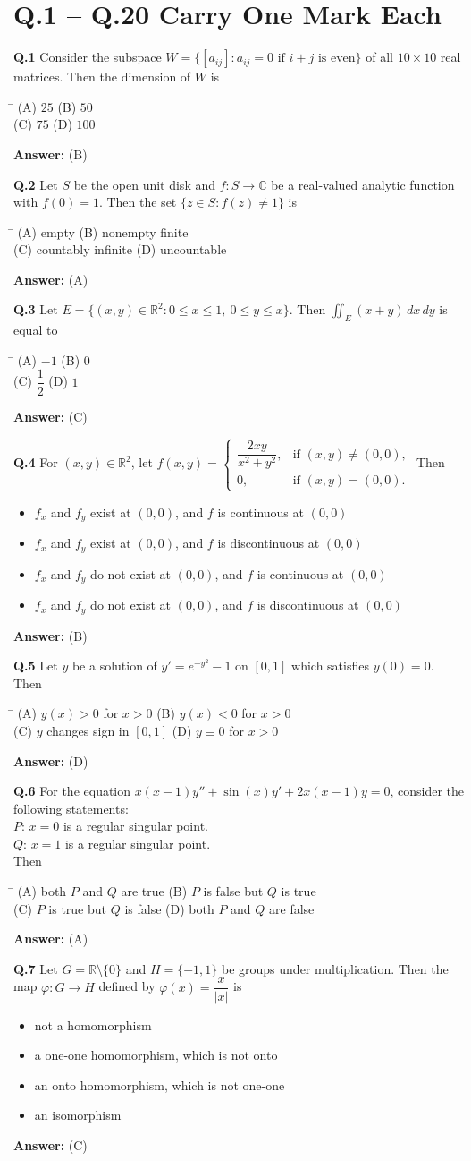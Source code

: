 \documentclass[11pt,a4paper]{article}
\newcommand{\optsfourA}[4]{%
  \begin{tabbing}
    \hspace{0.48\linewidth}\=\kill
    (A) #1 \> (B) #2 \\[2pt]
    (C) #3 \> (D) #4
  \end{tabbing}%
}
\newcommand{\optslistA}[4]{%
  \begin{itemize}
    \setlength{\itemsep}{2pt}\setlength{\parskip}{0pt}
    \item[(A)] #1
    \item[(B)] #2
    \item[(C)] #3
    \item[(D)] #4
  \end{itemize}%
}
\newcommand{\ans}[1]{\textbf{Answer:} #1\par\medskip}
\begin{document}
\section*{Q.1 -- Q.20 Carry One Mark Each}

\textbf{Q.1} Consider the subspace $W = \{[a_{ij}] : a_{ij} = 0 \text{ if } i + j \text{ is even}\}$ of all $10 \times 10$ real matrices. Then the dimension of $W$ is
\optsfourA{$25$}{$50$}{$75$}{$100$}
\ans{(B)}

\textbf{Q.2} Let $S$ be the open unit disk and $f : S \to \mathbb{C}$ be a real-valued analytic function with $f(0) = 1$. Then the set $\{z \in S : f(z) \ne 1\}$ is
\optsfourA{empty}{nonempty finite}{countably infinite}{uncountable}
\ans{(A)}

\textbf{Q.3} Let $E = \{(x,y) \in \mathbb{R}^2 : 0 \le x \le 1,\ 0 \le y \le x\}$. Then $\displaystyle\iint_E (x + y)\,dx\,dy$ is equal to
\optsfourA{$-1$}{$0$}{$\dfrac{1}{2}$}{$1$}
\ans{(C)}

\textbf{Q.4} For $(x,y) \in \mathbb{R}^2$, let $f(x,y) = \begin{cases} \dfrac{2xy}{x^2 + y^2}, & \text{if } (x,y) \ne (0,0), \\ 0, & \text{if } (x,y) = (0,0). \end{cases}$ Then
\optslistA{$f_x$ and $f_y$ exist at $(0,0)$, and $f$ is continuous at $(0,0)$}{$f_x$ and $f_y$ exist at $(0,0)$, and $f$ is discontinuous at $(0,0)$}{$f_x$ and $f_y$ do not exist at $(0,0)$, and $f$ is continuous at $(0,0)$}{$f_x$ and $f_y$ do not exist at $(0,0)$, and $f$ is discontinuous at $(0,0)$}
\ans{(B)}

\textbf{Q.5} Let $y$ be a solution of $y' = e^{-y^2} - 1$ on $[0, 1]$ which satisfies $y(0) = 0$. Then
\optsfourA{$y(x) > 0$ for $x > 0$}{$y(x) < 0$ for $x > 0$}{$y$ changes sign in $[0, 1]$}{$y \equiv 0$ for $x > 0$}
\ans{(D)}

\textbf{Q.6} For the equation $x(x - 1)y'' + \sin(x)y' + 2x(x - 1)y = 0$, consider the following statements:\\
$P$: $x = 0$ is a regular singular point.\\
$Q$: $x = 1$ is a regular singular point.\\
Then
\optsfourA{both $P$ and $Q$ are true}{$P$ is false but $Q$ is true}{$P$ is true but $Q$ is false}{both $P$ and $Q$ are false}
\ans{(A)}

\textbf{Q.7} Let $G = \mathbb{R} \setminus \{0\}$ and $H = \{-1, 1\}$ be groups under multiplication. Then the map $\varphi : G \to H$ defined by $\varphi(x) = \dfrac{x}{|x|}$ is
\optslistA{not a homomorphism}{a one-one homomorphism, which is not onto}{an onto homomorphism, which is not one-one}{an isomorphism}
\ans{(C)}
\end{document}
